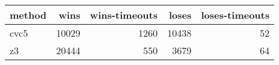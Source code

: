 \begin{tabular}{lrrrr}
\hline
 method   &   wins &   wins-timeouts &   loses &   loses-timeouts \\
\hline
 cvc5     &  10029 &            1260 &   10438 &               52 \\
 z3       &  20444 &             550 &    3679 &               64 \\
\hline
\end{tabular}
